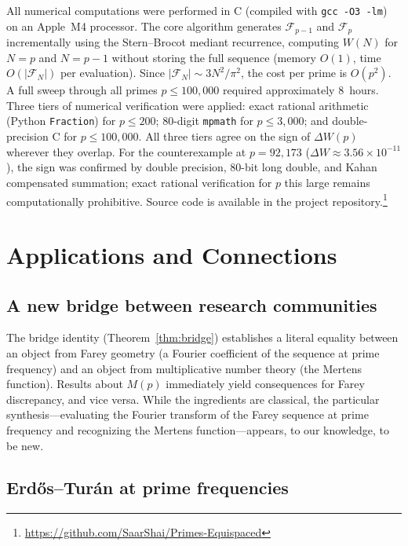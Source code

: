 \documentclass[11pt]{article}
\theoremstyle{definition}
\newcommand{\F}{\mathcal{F}}
\begin{document}
All numerical computations were performed in C (compiled with
\texttt{gcc -O3 -lm}) on an Apple~M4 processor.  The core
algorithm generates $\F_{p-1}$ and $\F_p$ incrementally using
the Stern--Brocot mediant recurrence, computing $W(N)$ for
$N = p$ and $N = p-1$ without storing the full sequence
(memory $O(1)$, time $O(|\F_N|)$ per evaluation).  Since
$|\F_N| \sim 3N^2/\pi^2$, the cost per prime is $O(p^2)$.
A full sweep through all primes $p \le 100{,}000$ required
approximately 8~hours.  Three tiers of numerical verification were applied:
exact rational arithmetic (Python \texttt{Fraction}) for
$p \le 200$; 80-digit \texttt{mpmath} for $p \le 3{,}000$;
and double-precision C for $p \le 100{,}000$.  All three
tiers agree on the sign of $\Delta W(p)$ wherever they overlap.  For the counterexample at
$p = 92{,}173$ ($\Delta W \approx 3.56 \times 10^{-11}$), the
sign was confirmed by double precision, 80-bit long double,
and Kahan compensated summation; exact rational verification
for $p$ this large remains computationally prohibitive.
Source code is available in the project
repository.\footnote{\url{https://github.com/SaarShai/Primes-Equispaced}}


\section{Applications and Connections}\label{sec:connections}

\subsection{A new bridge between research communities}

The bridge identity (Theorem~\ref{thm:bridge}) establishes a
literal equality between an object from Farey geometry (a Fourier
coefficient of the sequence at prime frequency) and an object from
multiplicative number theory (the Mertens function).  Results about
$M(p)$ immediately yield consequences for Farey discrepancy, and
vice versa.  While the ingredients are classical, the particular
synthesis---evaluating the Fourier transform of the Farey sequence
at prime frequency and recognizing the Mertens function---appears,
to our knowledge, to be new.

\subsection{Erd\H{o}s--Tur\'an at prime frequencies}
\end{document}
